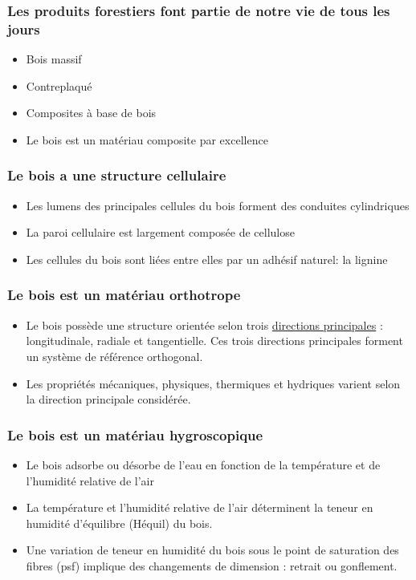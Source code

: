 \subsubsection{Les produits forestiers font partie de notre vie de tous les jours}

\begin{itemize}
\item Bois massif
\item Contreplaqué
\item Composites à base de bois
\item Le bois est un matériau composite par excellence
\end{itemize}

\subsubsection{Le bois a une structure cellulaire}

\begin{itemize}
\item Les lumens des principales cellules du bois forment des conduites cylindriques
\item La paroi cellulaire est largement composée de cellulose
\item Les cellules du bois sont liées entre elles par un adhésif naturel: la lignine
\end{itemize}

\subsubsection{Le bois est un matériau orthotrope}

\begin{itemize}
\item Le bois possède une structure orientée selon trois \hyperref[directions]{directions principales} : longitudinale, radiale et tangentielle. Ces trois directions principales forment un système de référence orthogonal. 
\item Les propriétés mécaniques, physiques, thermiques et hydriques varient selon la direction principale considérée. 
\end{itemize}

\subsubsection{Le bois est un matériau hygroscopique}

\begin{itemize}
\item Le bois adsorbe ou désorbe de l'eau en fonction de la température et de l'humidité relative de l'air
\item La température et l'humidité relative de l'air déterminent la teneur en humidité d'équilibre (Héquil) du bois.
\item Une variation de teneur en humidité du bois sous le point de saturation des fibres (psf) implique des changements de dimension : retrait ou gonflement.
\end{itemize}

